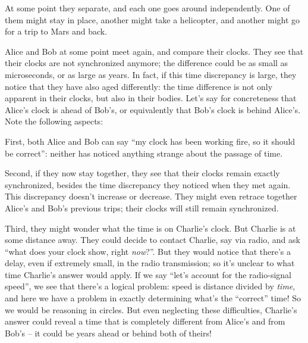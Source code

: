 \documentclass[a4paper,12pt,%
onecolumn,oneside,%
british%
]{memoir}
\renewcommand*{\|}[1][]{\nonscript\:#1\vert\nonscript\:\mathopen{}}
\begin{document}
At some point they separate, and each one goes around independently. One of them might stay in place, another might take a helicopter, and another might go for a trip to Mars and back.

Alice and Bob at some point meet again, and compare their clocks. They see that their clocks are not synchronized anymore; the difference could be as small as microseconds, or as large as years. In fact, if this time discrepancy is large, they notice that they have also aged differently: the time difference is not only apparent in their clocks, but also in their bodies. Let's say for concreteness that Alice's clock is ahead of Bob's, or equivalently that Bob's clock is behind Alice's. Note the following aspects:

First, both Alice and Bob can say \enquote{my clock has been working fire, so it should be correct}: neither has noticed anything strange about the passage of time.

Second, if they now stay together, they see that their clocks remain exactly synchronized, besides the time discrepancy they noticed when they met again. This discrepancy doesn't increase or decrease. They might even retrace together Alice's and Bob's previous trips; their clocks will still remain synchronized.

Third, they might wonder what the time is on Charlie's clock. But Charlie is at some distance away. They could decide to contact Charlie, say via radio, and ask \enquote{what does your clock show, right \emph{now}?}. But they would notice that there's a delay, even if extremely small, in the radio transmission; so it's unclear to what time Charlie's answer would apply. If we say \enquote{let's account for the radio-signal speed}, we see that there's a logical problem: speed is distance divided by \emph{time}, and here we have a problem in exactly determining what's the \enquote{correct} time! So we would be reasoning in circles. But even neglecting these difficulties, Charlie's answer could reveal a time that is completely different from Alice's and from Bob's -- it could be years ahead or behind both of theirs!
\end{document}
